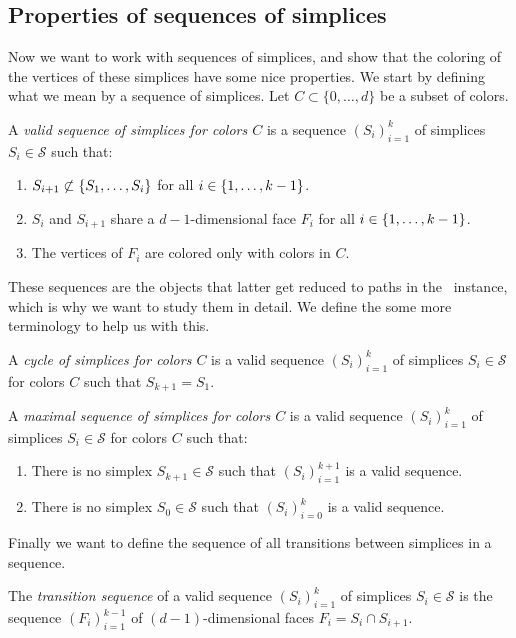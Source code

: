 \subsection{Properties of sequences of simplices}

Now we want to work with sequences of simplices, and show that the coloring of the vertices of these simplices have some nice properties. We start by defining what we mean by a sequence of simplices. Let $C \subset \{0, \dots, d\}$ be a subset of colors.
\begin{definition}
    A \emph{valid sequence of simplices for colors $C$} is a sequence $\left(S_i\right)_{i=1}^{k}$ of simplices $S_i \in \mathcal{S}$ such that:
    \begin{enumerate}
        \item $S_{i+1} \not\subset \left\{S_1, \dots, S_i\right\}$ for all $i \in \left\{1, \dots, k-1\right\}$.
        \item $S_i$ and $S_{i+1}$ share a $d-1$-dimensional face $F_i$ for all $i \in \left\{1, \dots, k-1\right\}$.
        \item The vertices of $F_i$ are colored only with colors in $C$.
    \end{enumerate}
\end{definition}
These sequences are the objects that latter get reduced to paths in the \EndOfLine\ instance, which is why we want to study them in detail. We define the some more terminology to help us with this.
\begin{definition}[Cycle]
    A \emph{cycle of simplices for colors $C$} is a valid sequence $\left(S_i\right)_{i=1}^{k}$ of simplices $S_i \in \mathcal{S}$ for colors $C$ such that $S_{k+1} = S_1$.
\end{definition}
\begin{definition}
    A \emph{maximal sequence of simplices for colors $C$} is a valid sequence $\left(S_i\right)_{i=1}^{k}$ of simplices $S_i \in \mathcal{S}$ for colors $C$ such that:
    \begin{enumerate}
        \item There is no simplex $S_{k+1} \in \mathcal{S}$ such that $\left(S_i\right)_{i=1}^{k+1}$ is a valid sequence.
        \item There is no simplex $S_{0} \in \mathcal{S}$ such that $\left(S_i\right)_{i=0}^{k}$ is a valid sequence.
    \end{enumerate}
\end{definition}
Finally we want to define the sequence of all transitions between simplices in a sequence.
\begin{definition}
    The \emph{transition sequence} of a valid sequence $\left(S_i\right)_{i=1}^{k}$ of simplices $S_i \in \mathcal{S}$ is the sequence $\left(F_i\right)_{i=1}^{k-1}$ of $(d-1)$-dimensional faces $F_i = S_i \cap S_{i+1}$.
\end{definition}

